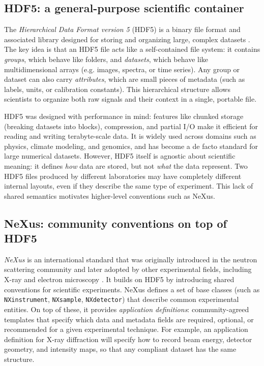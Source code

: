 \subsection{HDF5: a general-purpose scientific container}

The \textit{Hierarchical Data Format version 5} (HDF5) is a binary file format and associated library designed for storing and organizing large, complex datasets \parencite{nexusManual}. 
The key idea is that an HDF5 file acts like a self-contained file system: it contains \textit{groups}, which behave like folders, and \textit{datasets}, which behave like multidimensional arrays (e.g. images, spectra, or time series). 
Any group or dataset can also carry \textit{attributes}, which are small pieces of metadata (such as labels, units, or calibration constants). 
This hierarchical structure allows scientists to organize both raw signals and their context in a single, portable file. 

HDF5 was designed with performance in mind: features like chunked storage (breaking datasets into blocks), compression, and partial I/O make it efficient for reading and writing terabyte-scale data. 
It is widely used across domains such as physics, climate modeling, and genomics, and has become a de facto standard for large numerical datasets. 
However, HDF5 itself is agnostic about scientific meaning: it defines \emph{how} data are stored, but not \emph{what} the data represent. 
Two HDF5 files produced by different laboratories may have completely different internal layouts, even if they describe the same type of experiment. 
This lack of shared semantics motivates higher-level conventions such as NeXus.

\subsection{NeXus: community conventions on top of HDF5}

\textit{NeXus} is an international standard that was originally introduced in the neutron scattering community and later adopted by other experimental fields, including X-ray and electron microscopy \parencite{nxcanSASguide,nxvalidate}. 
It builds on HDF5 by introducing shared conventions for scientific experiments. 
NeXus defines a set of base classes (such as \texttt{NXinstrument}, \texttt{NXsample}, \texttt{NXdetector}) that describe common experimental entities. 
On top of these, it provides \textit{application definitions}: community-agreed templates that specify which data and metadata fields are required, optional, or recommended for a given experimental technique. 
For example, an application definition for X-ray diffraction will specify how to record beam energy, detector geometry, and intensity maps, so that any compliant dataset has the same structure. 


